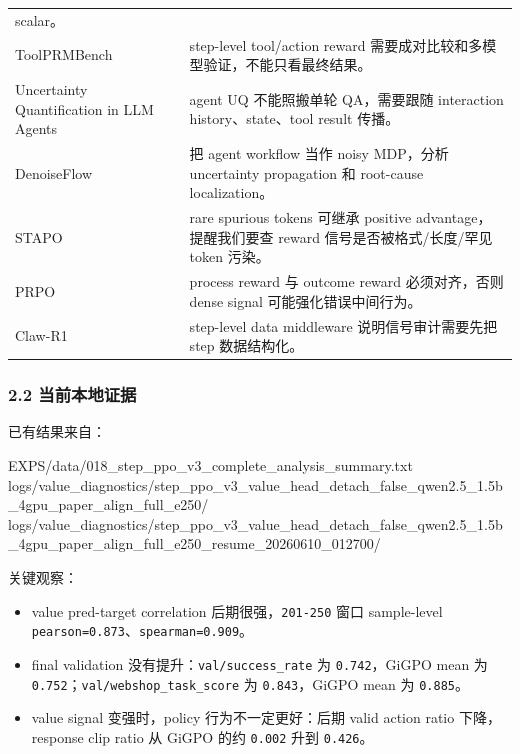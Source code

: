 \documentclass[
  10pt,
]{ctexart}
\newenvironment{Shaded}{}{}
\newcommand{\NormalTok}[1]{#1}
\providecommand{\tightlist}{%
  \setlength{\itemsep}{0pt}\setlength{\parskip}{0pt}}
\begin{document}
{\begin{longtable}[]{@{}
  >{\raggedright\arraybackslash}p{}
  >{\raggedright\arraybackslash}p{}@{}}
scalar。 \\
ToolPRMBench & step-level tool/action reward
需要成对比较和多模型验证，不能只看最终结果。 \\
Uncertainty Quantification in LLM Agents & agent UQ 不能照搬单轮
QA，需要跟随 interaction history、state、tool result 传播。 \\
DenoiseFlow & 把 agent workflow 当作 noisy MDP，分析 uncertainty
propagation 和 root-cause localization。 \\
STAPO & rare spurious tokens 可继承 positive advantage，提醒我们要查
reward 信号是否被格式/长度/罕见 token 污染。 \\
PRPO & process reward 与 outcome reward 必须对齐，否则 dense signal
可能强化错误中间行为。 \\
Claw-R1 & step-level data middleware 说明信号审计需要先把 step
数据结构化。 \\
\end{longtable}
}

\subsubsection{2.2
当前本地证据}\label{ux5f53ux524dux672cux5730ux8bc1ux636e}

已有结果来自：

\begin{Shaded}
\begin{Highlighting}[]
\NormalTok{EXPS/data/018\_step\_ppo\_v3\_complete\_analysis\_summary.txt}
\NormalTok{logs/value\_diagnostics/step\_ppo\_v3\_value\_head\_detach\_false\_qwen2.5\_1.5b\_4gpu\_paper\_align\_full\_e250/}
\NormalTok{logs/value\_diagnostics/step\_ppo\_v3\_value\_head\_detach\_false\_qwen2.5\_1.5b\_4gpu\_paper\_align\_full\_e250\_resume\_20260610\_012700/}
\end{Highlighting}
\end{Shaded}

关键观察：

\begin{itemize}
\tightlist
\item
  value pred-target correlation 后期很强，\texttt{201-250} 窗口
  sample-level \texttt{pearson=0.873}、\texttt{spearman=0.909}。
\item
  final validation 没有提升：\texttt{val/success\_rate} 为
  \texttt{0.742}，GiGPO mean 为
  \texttt{0.752}；\texttt{val/webshop\_task\_score} 为
  \texttt{0.843}，GiGPO mean 为 \texttt{0.885}。
\item
  value signal 变强时，policy 行为不一定更好：后期 valid action ratio
  下降，response clip ratio 从 GiGPO 的约 \texttt{0.002} 升到
  \texttt{0.426}。
\end{itemize}
\end{document}
